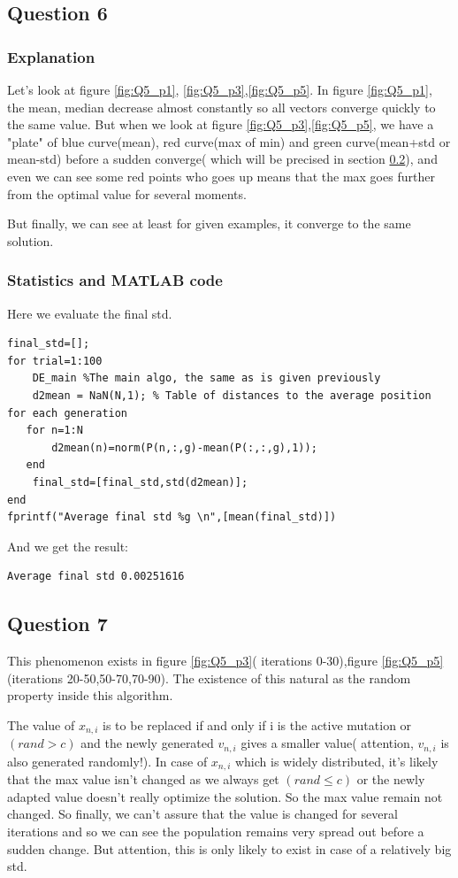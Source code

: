 \documentclass{CSArticle}[english]
\begin{document}
\subsection{Question 6}
\subsubsection{Explanation}
Let's look at figure \ref{fig:Q5_p1}, \ref{fig:Q5_p3},\ref{fig:Q5_p5}. In figure \ref{fig:Q5_p1}, the mean, median decrease almost constantly so all vectors converge quickly to the same value. But when we look at figure \ref{fig:Q5_p3},\ref{fig:Q5_p5}, we have a "plate" of blue curve(mean), red curve(max of min) and green curve(mean+std or mean-std) before a sudden converge( which will be precised in section \ref{Q7}), and even we can see some red points who goes up means that the max goes further from the optimal value for several moments.\par
But finally, we can see at least for given examples, it converge to the same solution.
\subsubsection{Statistics and MATLAB code}
\label{code_2}
Here we evaluate the final std.
\begin{lstlisting}[style=MATLAB]
%% Evaluation
final_std=[];
for trial=1:100
    DE_main %The main algo, the same as is given previously
    d2mean = NaN(N,1); % Table of distances to the average position for each generation
   for n=1:N
       d2mean(n)=norm(P(n,:,g)-mean(P(:,:,g),1));
   end
    final_std=[final_std,std(d2mean)];
end
fprintf("Average final std %g \n",[mean(final_std)]) 
\end{lstlisting}
And we get the result:
\begin{lstlisting}[style=RESULT]
Average final std 0.00251616 
\end{lstlisting}

\subsection{Question 7}
\label{Q7}
This phenomenon exists in figure \ref{fig:Q5_p3}( iterations 0-30),figure \ref{fig:Q5_p5}(iterations 20-50,50-70,70-90). The existence of this natural as the random property inside this algorithm.\par
The value of $x_{n,i}$ is to be replaced if and only if i is the active mutation or $(rand>c)$ and the newly generated $v_{n,i}$ gives a smaller value( attention, $v_{n,i}$ is also generated randomly!). In case of $x_{n,i}$ which is widely distributed, it's likely that the max value isn't changed as we always get $(rand\leq c)$ or the newly adapted value doesn't really optimize the solution. So the max value remain not changed. So finally, we can't assure that the value is changed for several iterations and so we can see the population remains very spread out before a sudden change. But attention, this is only likely to exist in case of a relatively big std.
\end{document}
